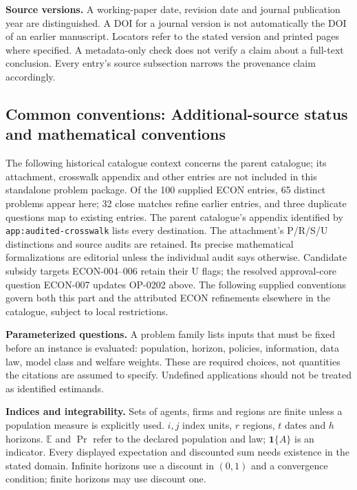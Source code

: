 \documentclass[11pt,a4paper]{article}
\begin{document}
\textbf{Source versions.} A working-paper date, revision date and journal publication year are distinguished. A DOI for a journal version is not automatically the DOI of an earlier manuscript. Locators refer to the stated version and printed pages where specified. A metadata-only check does not verify a claim about a full-text conclusion. Every entry's source subsection narrows the provenance claim accordingly.

\subsection*{Common conventions: Additional-source status and mathematical conventions}

\label{audited:conventions}

The following historical catalogue context concerns the parent catalogue;
its attachment, crosswalk appendix and other entries are not included in this
standalone problem package.
Of the 100 supplied ECON entries, 65 distinct problems appear here; 32 close
matches refine earlier entries, and three duplicate questions map to existing
entries. The parent catalogue's appendix identified by
\texttt{app:audited-crosswalk} lists every destination.
The attachment's P/R/S/U distinctions and source audits are retained. Its
precise mathematical formalizations are editorial unless the individual audit
says otherwise. Candidate subsidy targets ECON-004--006 retain their U flags;
the resolved approval-core question ECON-007 updates OP-0202 above.
The following supplied conventions govern both this part and the attributed
ECON refinements elsewhere in the catalogue, subject to local restrictions.

\textbf{Parameterized questions.} A problem family lists inputs that must be fixed before an instance is evaluated: population, horizon, policies, information, data law, model class and welfare weights. These are required choices, not quantities the citations are assumed to specify. Undefined applications should not be treated as identified estimands.

\textbf{Indices and integrability.} Sets of agents, firms and regions are finite unless a population measure is explicitly used. \(i,j\) index units, \(r\) regions, \(t\) dates and \(h\) horizons. \(\mathbb E\) and \(\Pr\) refer to the declared population and law; \(\mathbf1\{A\}\) is an indicator. Every displayed expectation and discounted sum needs existence in the stated domain. Infinite horizons use a discount in \((0,1)\) and a convergence condition; finite horizons may use discount one.
\end{document}

